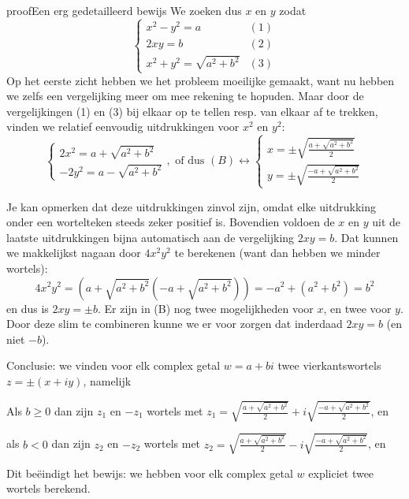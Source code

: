 \documentclass{ximera}
\begin{document}
\begin{expandable}{proof}{Een erg gedetailleerd bewijs}
        We zoeken dus $x$ en $y$ zodat
        \begin{equation}
        \begin{cases} x^2 - y^2 = a & (1) \\
                        2xy = b & (2) \\
                     x^2 + y^2 = \sqrt{a^2+b^2} & (3)
        \end{cases} 
        \end{equation}
        Op het eerste zicht hebben we het probleem moeilijke gemaakt, want nu hebben we zelfs een vergelijking meer om mee rekening te hopuden.
        Maar door de vergelijkingen (1) en (3) bij elkaar op te tellen resp. van elkaar af te trekken, vinden we relatief eenvoudig uitdrukkingen voor $x^2$ en $y^2$:
        $$
        \begin{cases} 2x^2 = a + \sqrt{a^2+b^2} \\
                    -2y^2 = a -\sqrt{a^2+b^2} 
        \end{cases}
        , \text{ of dus } (B) \leftrightarrow 
        \begin{cases} x = \pm\sqrt{\frac{a + \sqrt{a^2+b^2}}{2}} \\
                      y = \pm\sqrt{\frac{-a +\sqrt{a^2+b^2}}{2}} 
        \end{cases}
        $$

        Je kan opmerken dat deze uitdrukkingen zinvol zijn, omdat elke uitdrukking onder een wortelteken steeds zeker positief is.
        Bovendien voldoen de $x$ en $y$ uit de laatste uitdrukkingen bijna automatisch aan de vergelijking $2xy=b$. 
        Dat kunnen we makkelijkst nagaan door $4x^2y^2$ te berekenen (want dan hebben we minder wortels):
        $$
        4x^2y^2 = (a+\sqrt{a^2+b^2}(-a+\sqrt{a^2+b^2})) = -a^2 + (a^2+b^2) = b^2
        $$
        en dus is $2xy=\pm b$. 
        Er zijn in (B) nog twee mogelijkheden voor $x$, en twee voor $y$. Door deze slim te combineren kunne we er voor zorgen dat inderdaad $2xy=b$ (en niet $-b$).
        
        Conclusie: we vinden voor elk complex getal $w=a+bi$ twee vierkantswortels $z=\pm(x+iy)$, namelijk

        Als $b\geq 0$ dan zijn $z_1$ en $-z_1$ wortels met $z_1 = \sqrt{\frac{a + \sqrt{a^2+b^2}}{2}} + i\sqrt{\frac{-a + \sqrt{a^2+b^2}}{2}}$, en 

        als $b< 0$ dan zijn $z_2$ en $-z_2$ wortels met $z_2 = \sqrt{\frac{a + \sqrt{a^2+b^2}}{2}} - i\sqrt{\frac{-a + \sqrt{a^2+b^2}}{2}}$, en 

        Dit beëindigt het bewijs: we hebben voor elk complex getal $w$ expliciet twee wortels berekend.
    \end{expandable}
\end{document}
